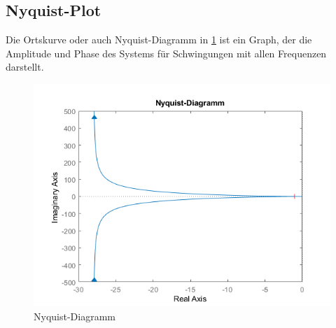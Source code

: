 \subsection{Nyquist-Plot}

Die Ortskurve oder auch Nyquist-Diagramm in \ref{fig:nyquist-diagram} ist ein Graph, der die Amplitude und Phase des Systems für Schwingungen mit allen Frequenzen darstellt.

\begin{figure}[H]
	\centering
	\includegraphics[width=0.7\linewidth]{"diagrams/nyquist diagram"}
	\caption[Nyquist-Diagramm]{Nyquist-Diagramm}
	\label{fig:nyquist-diagram}
\end{figure}